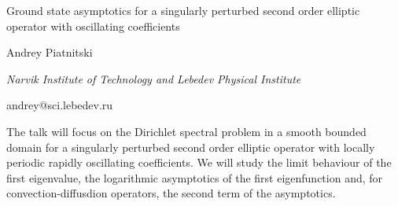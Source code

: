 \documentclass[10pt,a4paper]{article}
\begin{document}
\begin{center}

{\Large Ground state asymptotics for a singularly perturbed second order elliptic operator with oscillating coefficients}

\bigskip

{\sc Andrey Piatnitski}

{\small\it Narvik Institute of Technology and Lebedev Physical Institute}

{\small\rm andrey@sci.lebedev.ru}

\end{center}

\bigskip

The talk will focus on the Dirichlet spectral problem
in a smooth bounded domain
for a singularly perturbed second order elliptic operator
with locally periodic rapidly oscillating coefficients.
We will study the limit behaviour of the first eigenvalue,
the logarithmic asymptotics of the first eigenfunction
and, for convection-diffusdion operators, the second term
of the asymptotics.
\end{document}
